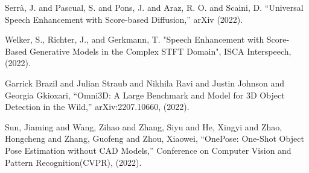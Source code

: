 \documentclass[a4j]{jarticle}
\begin{document}
\begin{thebibliography}{99}
Serrà, J. and Pascual, S. and Pons, J. and Araz, R. O. and Scaini, D. “Universal Speech Enhancement with Score-based Diffusion,” arXiv (2022).

Welker, S., Richter, J., and Gerkmann, T. "Speech Enhancement with Score-Based Generative Models in the Complex STFT Domain", ISCA Interspeech, (2022).

Garrick Brazil and Julian Straub and Nikhila Ravi and Justin Johnson and Georgia Gkioxari, “Omni3D: A Large Benchmark and Model for {3D} Object Detection in the Wild,” arXiv:2207.10660, (2022).

Sun, Jiaming and Wang, Zihao and Zhang, Siyu and He, Xingyi and Zhao, Hongcheng and Zhang, Guofeng and Zhou, Xiaowei, “OnePose: One-Shot Object Pose Estimation without CAD Models,” Conference on Computer Vision and Pattern Recognition(CVPR), (2022).

\end{thebibliography}
\end{document}

